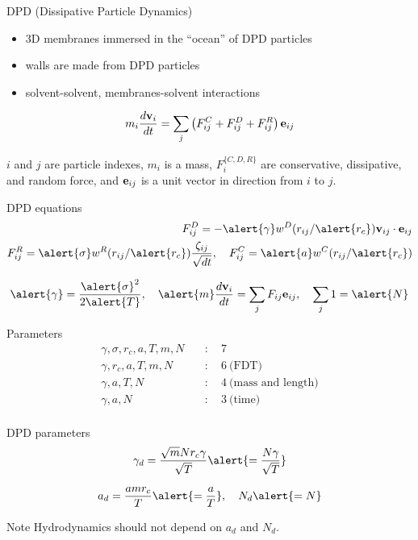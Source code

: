 \begin{frame}{DPD (Dissipative Particle Dynamics)}
\begin{itemize}
  \item 3D membranes immersed in the ``ocean'' of DPD particles
  \item walls are made from DPD particles
  \item solvent-solvent, membranes-solvent interactions
\end{itemize}

\[
  m_i \frac{d \mathbf{v}_i}{dt} = \sum_{j}
  \left(
    F_{ij}^{C} + F_{ij}^{D} + F_{ij}^{R}
  \right) \mathbf{e}_{ij}{}
\]

$i$ and $j$ are particle indexes, $m_i$ is a mass, $F_{i}^{\{C,D,R\}}$
are conservative, dissipative, and random force, and $\mathbf{e}_{ij}{}$ is a unit
vector in direction from $i$ to $j$.
\end{frame}

\begin{frame}{DPD equations}
\begin{align*}
  \label{eq:FD}
  F_{ij}^D = - \alert{\gamma} w^{D}(r_{ij}/\alert{r_{c}}) \mathbf{v}_{ij} \cdot \mathbf{e}_{ij} \\
  F_{ij}^R = \alert{\sigma} w^{R}(r_{ij}/\alert{r_{c}}) \frac{\zeta_{ij}}{\sqrt{dt}}, \quad
  F_{ij}^C = \alert{a} w^C(r_{ij}/\alert{r_{c}})
\end{align*}

\[
  \alert{\gamma} =\frac{\alert{\sigma}^2}{2\alert{T}},
  \quad \alert{m} \frac{d \mathbf{v}_{i}}{dt} = \sum_j F_{ij} \mathbf{e}_{ij},
  \quad
  \sum_j 1 = \alert{N}
\]

\begin{exampleblock}{Parameters}
\begin{align*}
    \gamma,           \sigma ,     r_c, a, T,    m,    N \quad &: \quad 7 \\
    \gamma,                        r_c, a ,T,    m,    N \quad &: \quad 6\ \text{(FDT)} \\
    \gamma,                             a, T,    N       \quad &: \quad 4\ \text{(mass and length)} \\
    \gamma,                             a,       N       \quad &: \quad 3\ \text{(time)} \\
\end{align*}
\end{exampleblock}
\end{frame}

\begin{frame}{DPD parameters}
\[
  \gamma_d = \frac{ \sqrt{m} N r_c \gamma}{ \sqrt{T} }
  \alert{ = \frac{ N \gamma}{ \sqrt{T} } }
\]

\[
   a_d     = \frac{a m r_c}{ T } \alert{ = \frac{a}{T} }, \quad
   N_d                          \alert{ = N}
\]

\begin{exampleblock}{Note}
Hydrodynamics should not depend on  $a_d$ and $N_d$.
\end{exampleblock}
\end{frame}

